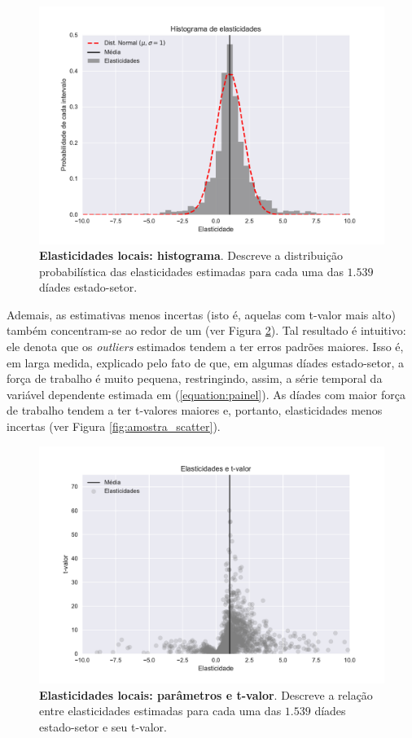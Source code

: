 \documentclass{article}
\begin{document}
\begin{figure}[ht]
    \centering
    \includegraphics[scale=0.6]{elastic_hist.pdf}
    \caption[Elasticidades locais: histograma]{\textbf{Elasticidades locais: histograma}. Descreve a distribuição probabilística das elasticidades estimadas para cada uma das $1.539$ díades estado-setor.}
    \label{fig:elastic_hist}
\end{figure}

Ademais, as estimativas menos incertas (isto é, aquelas com t-valor mais alto) também concentram-se ao redor de um (ver Figura \ref{fig:elastic_scatter}). Tal resultado é intuitivo: ele denota que os \textit{outliers} estimados tendem a ter erros padrões maiores. Isso é, em larga medida, explicado pelo fato de que, em algumas díades estado-setor, a força de trabalho é muito pequena, restringindo, assim, a série temporal da variável dependente estimada em (\ref{equation:painel}). As díades com maior força de trabalho tendem a ter t-valores maiores \textemdash e, portanto, elasticidades menos incertas (ver Figura \ref{fig:amostra_scatter}).

\newpage 

\begin{figure}[ht]
    \centering
    \includegraphics[scale=0.6]{elastic_scatter.pdf}
    \caption[Elasticidades locais: parâmetros e t-valor]{\textbf{Elasticidades locais: parâmetros e t-valor}. Descreve a relação entre elasticidades estimadas para cada uma das $1.539$ díades estado-setor e seu t-valor.}
    \label{fig:elastic_scatter}
\end{figure}
\end{document}
